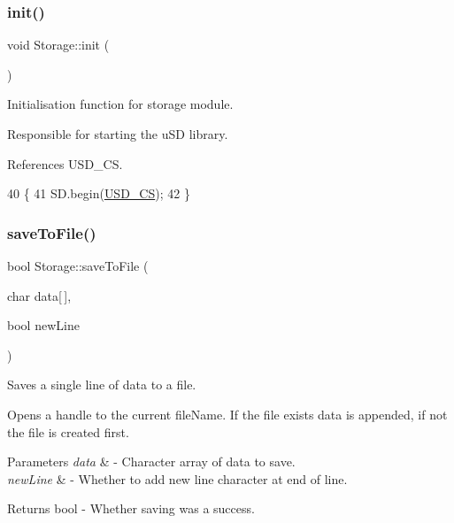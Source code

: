 \subsubsection{\texorpdfstring{init()}{init()}}
{\footnotesize\ttfamily void Storage\+::init (\begin{DoxyParamCaption}{ }\end{DoxyParamCaption})}



Initialisation function for storage module. 

Responsible for starting the u\+SD library. 

References U\+S\+D\+\_\+\+CS.


\begin{DoxyCode}
40 \{
41   SD.begin(\hyperlink{_storage_8cpp_abe774366dbdfb2de4e34e4f07843db38}{USD\_CS});
42 \}
\end{DoxyCode}
\mbox{\label{class_logging_device_1_1_storage_a044a17325b2917afca49aa19ddb488f6}} 
\subsubsection{\texorpdfstring{save\+To\+File()}{saveToFile()}}
{\footnotesize\ttfamily bool Storage\+::save\+To\+File (\begin{DoxyParamCaption}\item[{char}]{data\mbox{[}$\,$\mbox{]},  }\item[{bool}]{new\+Line }\end{DoxyParamCaption})}



Saves a single line of data to a file. 

Opens a handle to the current file\+Name. If the file exists data is appended, if not the file is created first.


\begin{DoxyParams}{Parameters}
{\em data} & -\/ Character array of data to save. \\
\hline
{\em new\+Line} & -\/ Whether to add new line character at end of line. \\
\hline
\end{DoxyParams}
\begin{DoxyReturn}{Returns}
bool -\/ Whether saving was a success. 
\end{DoxyReturn}



